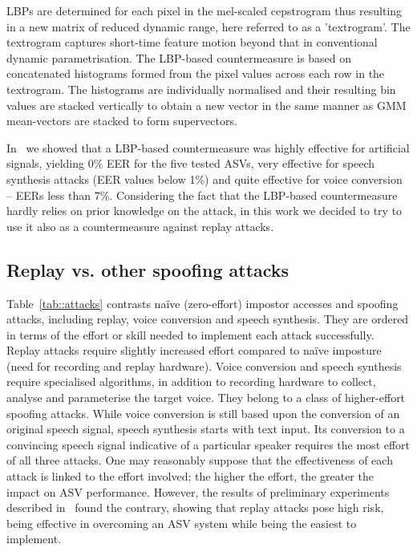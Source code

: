 LBPs are determined for each pixel in the mel-scaled cepstrogram thus resulting in a new matrix of reduced dynamic range, here referred to as a 'textrogram'.  The textrogram captures short-time feature motion beyond that in conventional dynamic parametrisation.  The LBP-based countermeasure is based on concatenated histograms formed from the pixel values across each row in the textrogram.  The histograms are individually normalised and their resulting bin values are stacked vertically to obtain a new vector in the same manner as GMM mean-vectors are stacked to form supervectors.  

In~\cite{Alegre2013a} we showed that a LBP-based countermeasure was highly effective for artificial signals, yielding 0\% EER for the five tested ASVs, very effective for speech synthesis attacks (EER values below 1\%) and quite effective for voice conversion -- EERs less than 7\%. Considering the fact that the LBP-based countermeasure hardly relies on prior knowledge on the attack, in this work we decided to try to use it also as a countermeasure against replay attacks.





\subsection{Replay vs. other spoofing attacks}
\label{sec::algorithms::playback}


Table~\ref{tab::attacks} contrasts na\"{i}ve (zero-effort) impostor accesses and spoofing attacks, including replay, voice conversion and speech synthesis.  
They are ordered in terms of the effort or skill needed to implement each attack successfully. 
Replay attacks require slightly increased effort compared to na\"{i}ve imposture (need for recording and replay hardware). 
Voice conversion and speech synthesis require specialised algorithms, in addition to recording hardware to collect, analyse and parameterise the target voice. 
They belong to a class of higher-effort spoofing attacks. 
While voice conversion is still based upon the conversion of an original speech signal, speech synthesis starts with text input. 
Its conversion to a convincing speech signal indicative of a particular speaker requires the most effort of all three attacks.
One may reasonably suppose that the effectiveness of each attack is linked to the effort involved; the higher the effort, the greater the impact on ASV performance. 
However, the results of preliminary experiments described in~\cite{Alegre2014a} found the contrary, showing that replay attacks pose high risk, being effective in overcoming an ASV system while being the easiest to implement.

